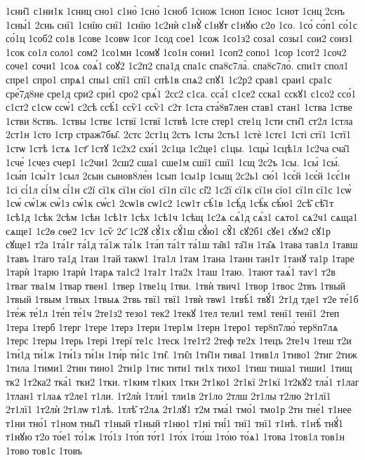 {1сни̑1
с1ни1к
1сниц
сно1
с1но̀
1сно́
1сноб
1снож
1сноп
1снос
1снот
1снц
2снъ
1сны́1
2снь
снї1
1снїю
снї1
1снїю
1с2нѝ
с1нꙋ̀
с1нꙋт
с1нꙋю
с2о
1со.
1со́
со́п1
со́1с
со́1ц
1соб2
со1в
1сове
1совѡ
1сог
1сод
сое1
1сож
1со1з2
соза1
созы1
сои2
соиз1
1сок
со1л
соло1
сом2
1со1мн
1сомꙋ
1со1н
сони1
1соп2
сопо1
1сор
1сот2
1соч2
соче1
сочи1
1соѧ
соѧ́1
соꙋ2
1с2п2
спа1д
спа1с
спа8с7ла̀.
спа8с7ло̀.
спи1т
спол1
спре1
спро1
спрѧ1
спы1
спї1
спї1
спѣ1в
спѧ2
спꙋ1
1с2р2
срав1
сраи1
сра1с
сре́7д8не
сре1д
сри2
сри́1
сро2
срѧ́1
2сс2
с1са.
сса́1
с1се2
сска1
сскꙋ1
с1со2
ссо́1
с1ст2
с1сѡ
ссѡ́1
с2сѣ
ссѣ́1
ссѷ1
ссѷ1
с2т
1ста
ста́8в7лен
став1
стан1
1ства
1стве
1стви
8ствъ.
1ствы
1ствє
1ствї
1ствї
1ствѣ
1сте
стер1
сте1ц
1сти
сти̑1
ст2л
1стла
2ст1н
1сто
1стр
страж7бы̑.
2стс
2ст1ц
2стъ
1сты
2сть1
1стѐ
1стє1
1сті
стї1
1стї1
1стѡ
1стѣ
1стѧ
1ст҃
1стꙋ
1с2х2
схи́1
2с1ца
1с2це1
с1цы.
1сцы̀
1сцѣ1л
1с2ча
сча̑1
1сче́
1счез
счер1
1с2чи1
2сш2
сша1
сше1м
сшї1
сшї1
1сщ
2с2ъ
1сы.
1сы̀
1сы́.
1сы́п
1сы́1т
1сыл
2сын
сынов8ле́н
1сып
1сы1р
1сыщ
2с2ь1
сю́1
1сє́й
1сє́й
1сє́1н
1сі
сі́1л
сі́1м
сі́1н
с2ї
сї1к
сї1н
сїо1
сї1п
сї1с
сі̑2
1с2ї
сї1к
сї1н
сїо1
сї1п
сї1с
1сѡ̀
1сѡ́
сѡ́1ж
сѡ́1з
сѡ́1к
сѡ́с1
2сѡ1в
сѡ1с2
1сѡ1т
сѣ́1в
1сѣ́д
1сѣ́к
сѣ́ю1
2сѣ̑
сѣ̑1т
1сѣ1д
1сѣк
2сѣм
1сѣн
1сѣ1т
1сѣх
1сѣ1ч
1сѣщ
1с2ѧ
сѧ́1д
сѧ́з1
сѧто1
сѧ2ч1
сѧща1
сѧще1
1с2ѳ
сѳе2
1сѵ
1сѷ
2с҃
1с2ꙋ
сꙋ́1х
сꙋ́1ш
сꙋ́ю1
сꙋ̑1
сꙋ2б1
сꙋе1
сꙋм2
сꙋ1р
сꙋще1
т2а
1та́1г
та́1д
та́1ж
та́1к
1та́п
та́1т
та́1ш
та̑в1
та̑1н
1та̑ѧ
1тава
тав1л
1тавш
1тавъ
1таго
та1д
1таи
1тай
такѡ1
1та1л
1там
1тана
1танн
тан1т
1танꙋ
та1р
1таре
1тарѝ
1тарю
1тарѝ
1тарѧ
та1с2
1та1т
1та2х
1таш
1таю.
1тают
таѧ́1
таѵ1
т2в
1тваг
тва1м
1твар
твен1
1твер
1тве1ц
1тви.
1твѝ
твич1
1твор
1твос
2твъ
1твый
1твый
1твым
1твых
1твыѧ
2твь
твї1
твї1
1твѝ
твѡ1
1твѣ́1
твꙋ́1
2т1д
тде1
т2е
те́1б
1те́ж
те́1л
1те́п
те́1ч
2те1з2
тезо1
тек2
1текꙋ
1тел
тели1
тем1
тенї1
тенї1
2теп
1тера
1терб
1терг
1тере
1терз
1тери
1тер1м
1терн
1теро1
тер8п7лю̀
тер8п7лѧ
1терс
1теры
1терь
1тері
1терї
те1с
1теск
1те1т2
2теф
те2х
1тецъ
2те1ч
1теш
т2и
1ти́1д
ти́1ж
1ти́1з
ти́1н
1ти́р
ти́1с
1ти̑.
1ти̑л
1ти̑1н
тива1
1тив1л
1тиво1
2тиг
2тиж
1тила
1тими1
2тин
тино1
2ти1р
1тис
тити1
ти1х
тихо1
1тиш
тиша1
тиши1
1тищ
тк2
1т2ка2
тка́1
тки2
1тки.
т1ким
т1ких
1ткн
2т1ко1
2т1кї
2т1кї
1т2кꙋ2
тла́1
т1лаг
1тлан1
т1лаѧ
т2ле1
т1ли.
1т2лѝ
1тли́1
тли1в
2т1ло
2тлш
2т1лы
т2лю
2т1лї1
2т1лї1
1т2лѝ
2т1лѡ
т1лѣ.
1тлѣ̑
т2лѧ
2т1лꙋ1
т2м
тма́1
тмо́1
тмо1р
2тн
тне́1
т1нее
т1ни
тно́1
т1ном
тны̑1
т1ный
т1ный
т1ню1
т1ні
тні́1
тнї1
тнї1
т1нѣ.
т1нѣ̀
тнꙋ́1
т1нꙋю
т2о
то́е1
то́1ж
1то́1з
1то́п
то́т1
1то́х
1то́ш
1то́ю
то́ѧ1
1това
1тов1л
тов1н
1тово
тов1с
1товъ
}
